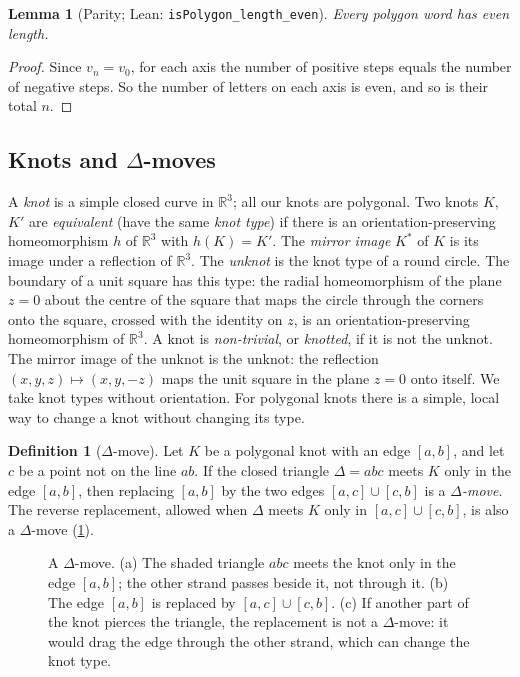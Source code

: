 \documentclass[11pt]{article}
\theoremstyle{plain}
\newtheorem{lemma}[theorem]{Lemma}
\theoremstyle{definition}
\newtheorem{definition}[theorem]{Definition}
\theoremstyle{remark}
\newcommand{\R}{\mathbb{R}}
\newcommand{\lean}[1]{\texttt{#1}}
\begin{document}
\begin{lemma}[Parity; Lean: \lean{isPolygon\_length\_even}]\label{lem:parity}
Every polygon word has even length.
\end{lemma}
\begin{proof}
Since $v_n=v_0$, for each axis the number of positive steps equals the number of negative steps. So
the number of letters on each axis is even, and so is their total $n$.
\end{proof}

\subsection{Knots and $\Delta$-moves}

A \emph{knot} is a simple closed curve in $\R^3$; all our knots are polygonal. Two knots $K$, $K'$ are
\emph{equivalent} (have the same \emph{knot type}) if there is an orientation-preserving homeomorphism
$h$ of $\R^3$ with $h(K)=K'$. The \emph{mirror image} $K^*$ of $K$ is its image under a reflection of
$\R^3$. The \emph{unknot} is the knot type of a round circle. The boundary of a unit square has this
type: the radial homeomorphism of the plane $z=0$ about the centre of the square that maps the circle
through the corners onto the square, crossed with the identity on $z$, is an orientation-preserving
homeomorphism of $\R^3$. A knot is \emph{non-trivial}, or \emph{knotted}, if it is not the unknot. The
mirror image of the unknot is the unknot: the reflection $(x,y,z)\mapsto(x,y,-z)$ maps the unit square
in the plane $z=0$ onto itself. We take knot types without orientation. For polygonal knots there is a simple, local way to
change a knot without changing its type.

\begin{definition}[$\Delta$-move]\label{def:delta}
Let $K$ be a polygonal knot with an edge $[a,b]$, and let $c$ be a point not on the line $ab$. If the
closed triangle $\Delta=abc$ meets $K$ only in the edge $[a,b]$, then replacing $[a,b]$ by the two
edges $[a,c]\cup[c,b]$ is a \emph{$\Delta$-move}. The reverse replacement, allowed when $\Delta$ meets
$K$ only in $[a,c]\cup[c,b]$, is also a $\Delta$-move (\cref{fig:delta}).
\end{definition}

\begin{figure}[t]
\centering
\FigDelta
\caption{A $\Delta$-move. (a) The shaded triangle $abc$ meets the knot only in the edge $[a,b]$;
the other strand passes beside it, not through it. (b) The edge $[a,b]$ is replaced by $[a,c]\cup[c,b]$.
(c) If another part of the knot pierces the triangle, the replacement is not a $\Delta$-move: it would
drag the edge through the other strand, which can change the knot type.}
\label{fig:delta}
\end{figure}
\end{document}
